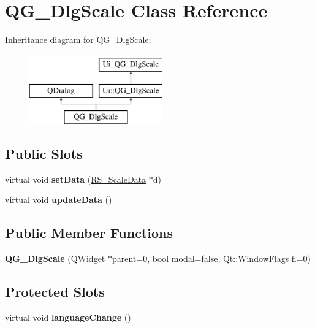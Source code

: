 \hypertarget{classQG__DlgScale}{\section{Q\-G\-\_\-\-Dlg\-Scale Class Reference}
\label{classQG__DlgScale}
}
Inheritance diagram for Q\-G\-\_\-\-Dlg\-Scale\-:\begin{figure}[H]
\begin{center}
\leavevmode
\includegraphics[height=3.000000cm]{classQG__DlgScale}
\end{center}
\end{figure}
\subsection*{Public Slots}
\begin{DoxyCompactItemize}
\item 
\hypertarget{classQG__DlgScale_a6f6aad9907c5f8ab4a7ec56fd924ed72}{virtual void {\bfseries set\-Data} (\hyperlink{classRS__ScaleData}{R\-S\-\_\-\-Scale\-Data} $\ast$d)}\label{classQG__DlgScale_a6f6aad9907c5f8ab4a7ec56fd924ed72}

\item 
\hypertarget{classQG__DlgScale_a16fd0e04c63ee392691ab47350a6f534}{virtual void {\bfseries update\-Data} ()}\label{classQG__DlgScale_a16fd0e04c63ee392691ab47350a6f534}

\end{DoxyCompactItemize}
\subsection*{Public Member Functions}
\begin{DoxyCompactItemize}
\item 
\hypertarget{classQG__DlgScale_aa678d66e621f9a68e70059d4048424cc}{{\bfseries Q\-G\-\_\-\-Dlg\-Scale} (Q\-Widget $\ast$parent=0, bool modal=false, Qt\-::\-Window\-Flags fl=0)}\label{classQG__DlgScale_aa678d66e621f9a68e70059d4048424cc}

\end{DoxyCompactItemize}
\subsection*{Protected Slots}
\begin{DoxyCompactItemize}
\item 
\hypertarget{classQG__DlgScale_a38c22a8a6277b3f9aa4f1e58a24d8df4}{virtual void {\bfseries language\-Change} ()}\label{classQG__DlgScale_a38c22a8a6277b3f9aa4f1e58a24d8df4}

\end{DoxyCompactItemize}
